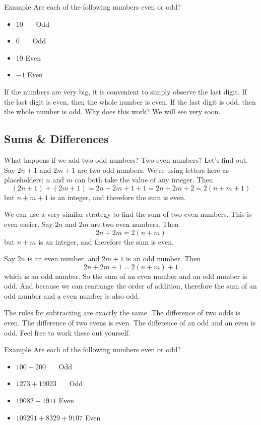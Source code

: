 \documentclass[a4paper,10pt]{report}
\begin{document}
\begin{problem}{Example}
 Are each of the following numbers even or odd?

 \begin{itemize}
  \item $10$ \hfill {}~~~Odd
  \item $0$ \hfill {}~~~Odd
  \item $19$ \hfill Even~~~
  \item $-1$ \hfill Even~~~
 \end{itemize}
\end{problem}

If the numbers are very big, it is convenient to simply observe the last digit.
If the last digit is even, then the whole number is even. If the last digit is
odd, then the whole number is odd. Why does this work? We will see very soon.

\subsection{Sums \& Differences}

What happens if we add two odd numbers? Two even numbers? Let's find out. Say
$2n+1$ and $2m+1$ are two odd numbers. We're using letters here as placeholders;
$n$ and $m$ can both take the value of any integer. Then \[
 (2n+1) + (2m+1) = 2n + 2m + 1 + 1 = 2n + 2m + 2 = 2(n+m+1)
\] but $n+m+1$ is an integer, and therefore the sum is even.

We can use a very similar strategy to find the sum of two even numbers. This is
even easier. Say $2n$ and $2m$ are two even numbers. Then \[
 2n + 2m = 2(n+m)
\] but $n+m$ is an integer, and therefore the sum is even.

Say $2n$ is an even number, and $2m+1$ is an odd number. Then \[
 2n + 2m + 1 = 2(n+m) + 1
\] which is an odd number. So the sum of an even number and an odd number is
odd. And because we can rearrange the order of addition, therefore the sum of an
odd number and a even number is also odd.

The rules for subtracting are exactly the same. The difference of two odds is
even. The difference of two evens is even. The difference of an odd and an even
is odd. Feel free to work these out yourself.

\begin{problem}{Example}
 Are each of the following numbers even or odd?

 \begin{itemize}
  \item $100 + 200$ \hfill {}~~~Odd
  \item $1273 + 19023$ \hfill {}~~~Odd
  \item $19082 - 1911$ \hfill Even~~~
  \item $109291 + 8329 + 9107$ \hfill Even~~~
 \end{itemize}
\end{problem}
\end{document}
